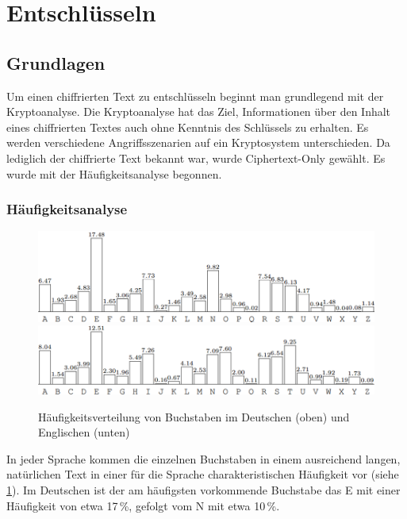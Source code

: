 \section{Entschlüsseln}
\subsection{Grundlagen}

Um einen chiffrierten Text zu entschlüsseln beginnt man grundlegend mit der Kryptoanalyse. 
Die Kryptoanalyse hat das Ziel, Informationen über den Inhalt eines chiffrierten
Textes auch ohne Kenntnis des Schlüssels zu erhalten. Es werden verschiedene
Angriffsszenarien auf ein Kryptosystem unterschieden. Da lediglich der
chiffrierte Text bekannt war, wurde Ciphertext-Only gewählt. Es wurde mit der
Häufigkeitsanalyse begonnen.

\subsubsection{Häufigkeitsanalyse}

\begin{figure}
 \includegraphics[width=\textwidth,keepaspectratio=true]{Images/buchstabenhaeufigkeiten_de}
 \includegraphics[width=\textwidth,keepaspectratio=true]{Images/buchstabenhaeufigkeiten_en}
 \caption{Häufigkeitsverteilung von Buchstaben im Deutschen (oben) und Englischen (unten) \cite[kap2.pdf, s. 30]{Koebler}}
 \label{fig:buchstabenhaeufigkeiten}
\end{figure}

In jeder Sprache kommen die einzelnen Buchstaben in einem ausreichend langen,
natürlichen Text in einer für die Sprache charakteristischen Häufigkeit vor
(siehe \cref{fig:buchstabenhaeufigkeiten}). Im Deutschen ist der am
häufigsten vorkommende Buchstabe das E mit einer Häufigkeit von etwa 17\,\%,
gefolgt vom N mit etwa 10\,\%.

